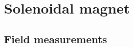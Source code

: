 
\section{Solenoidal magnet \label{sec:solenoid}}
\subsection{Field measurements \label{sec:bfield}}



